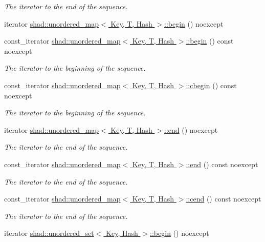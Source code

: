 \begin{DoxyCompactItemize}
\begin{DoxyCompactList}\small\item\em The iterator to the end of the sequence. \end{DoxyCompactList}\item 
iterator \hyperlink{group__Iterators_gad6f6e325f3b1ce921af1e410dbfe9710}{shad\-::unordered\-\_\-map$<$ Key, T, Hash $>$\-::begin} () noexcept
\item 
const\-\_\-iterator \hyperlink{group__Iterators_ga64e3e05b7d2e44f6996b32ac84722bc0}{shad\-::unordered\-\_\-map$<$ Key, T, Hash $>$\-::begin} () const noexcept
\begin{DoxyCompactList}\small\item\em The iterator to the beginning of the sequence. \end{DoxyCompactList}\item 
const\-\_\-iterator \hyperlink{group__Iterators_ga8d91fc63376329a528ac21d618efafb5}{shad\-::unordered\-\_\-map$<$ Key, T, Hash $>$\-::cbegin} () const noexcept
\begin{DoxyCompactList}\small\item\em The iterator to the beginning of the sequence. \end{DoxyCompactList}\item 
iterator \hyperlink{group__Iterators_ga34c20916fffb91405b135133803b69f9}{shad\-::unordered\-\_\-map$<$ Key, T, Hash $>$\-::end} () noexcept
\begin{DoxyCompactList}\small\item\em The iterator to the end of the sequence. \end{DoxyCompactList}\item 
const\-\_\-iterator \hyperlink{group__Iterators_gadc7ab9a75de9a65c0b74fe21f5ec5704}{shad\-::unordered\-\_\-map$<$ Key, T, Hash $>$\-::end} () const noexcept
\begin{DoxyCompactList}\small\item\em The iterator to the end of the sequence. \end{DoxyCompactList}\item 
const\-\_\-iterator \hyperlink{group__Iterators_ga2d943633cd73b5040014600a9cfe7084}{shad\-::unordered\-\_\-map$<$ Key, T, Hash $>$\-::cend} () const noexcept
\begin{DoxyCompactList}\small\item\em The iterator to the end of the sequence. \end{DoxyCompactList}\item 
iterator \hyperlink{group__Iterators_ga5ba277780850ab986e5ca0a86687ad23}{shad\-::unordered\-\_\-set$<$ Key, Hash $>$\-::begin} () noexcept

\end{DoxyCompactItemize}
